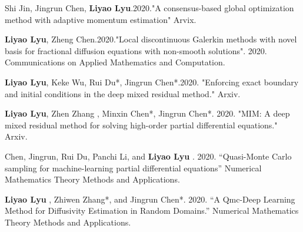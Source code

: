 \documentclass[a4paper,10pt,utf8]{article} %
\begin{document}
\begin{small}
Shi Jin, Jingrun Chen, \textbf{Liyao Lyu}.2020."A consensus-based global optimization method with adaptive momentum estimation" Arvix.

\textbf{Liyao Lyu}, Zheng Chen.2020."Local discontinuous Galerkin methods with novel basis for fractional diffusion equations with non-smooth solutions". 2020.
	Communications on Applied Mathematics and Computation.

\textbf{Liyao Lyu}, Keke Wu, Rui Du*, Jingrun Chen*.2020.
"Enforcing exact boundary and initial conditions in the deep mixed residual method." Arxiv.

\textbf{Liyao Lyu}, Zhen Zhang , Minxin Chen*, Jingrun Chen*. 2020. "MIM: A deep mixed residual method for solving high-order partial differential equations." Arxiv. 

Chen, Jingrun, Rui Du, Panchi Li, and \textbf{Liyao Lyu} . 2020. “Quasi-Monte Carlo sampling for machine-learning partial differential equations” Numerical Mathematics Theory Methods and Applications. 

\textbf{Liyao Lyu} , Zhiwen Zhang*, and Jingrun Chen*. 2020. “A Qmc-Deep Learning Method for Diffusivity Estimation in Random Domains.” Numerical Mathematics Theory Methods and Applications. 


\end{small}
\end{document}
